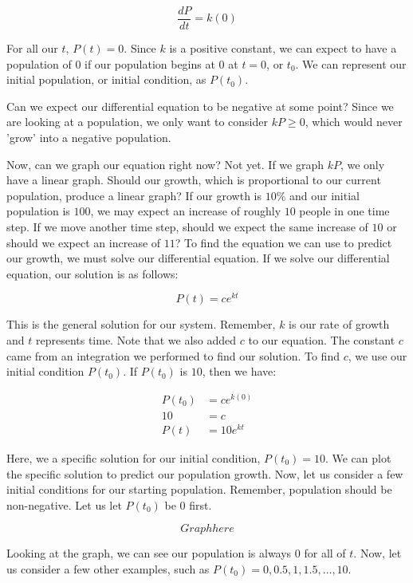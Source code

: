 \documentclass{amsart}
\theoremstyle{definition}
\numberwithin{equation}{section}
\begin{document}
\begin{sansmath}
\[ \frac{dP}{dt} = k(0)\]

For all our $t$, $P(t) = 0$. Since $k$ is a positive constant, we can expect to have a population of $0$ if our population begins at $0$ at $t = 0$, or $t_0$. We can represent our initial population, or initial condition, as $P(t_0)$.

Can we expect our differential equation to be negative at some point? Since we are looking at a population, we only want to consider $kP \geq 0$, which would never 'grow' into a negative population.

Now, can we graph our equation right now? Not yet. If we graph $kP$, we only have a linear graph. Should our growth, which is proportional to our current population, produce a linear graph? If our growth is $10\%$ and our initial population is $100$, we may expect an increase of roughly $10$ people in one time step. If we move another time step, should we expect the same increase of $10$ or should we expect an increase of $11$? To find the equation we can use to predict our growth, we must solve our differential equation. If we solve our differential equation, our solution is as follows:

\[ P(t) = ce^{kt} \]


This is the general solution for our system. Remember, $k$ is our rate of growth and $t$ represents time. Note that we also added $c$ to our equation. The constant $c$ came from an integration we performed to find our solution. To find $c$, we use our initial condition $P(t_0)$. If $P(t_0)$ is $10$, then we have:

\begin{align*}
  P(t_0) & = ce^{k(0)}\\
  10 & = c\\
  P(t) & = 10e^{kt}
\end{align*}

Here, we a specific solution for our initial condition, $P(t_0) = 10$. We can plot the specific solution to predict our population growth. Now, let us consider a few initial conditions for our starting population. Remember, population should be non-negative. Let us let $P(t_0)$ be $0$ first.

\[ Graph here \]

Looking at the graph, we can see our population is always $0$ for all of $t$. Now, let us consider a few other examples, such as $P(t_0) = 0, 0.5, 1, 1.5, \ldots, 10$.


\end{sansmath}
\end{document}
